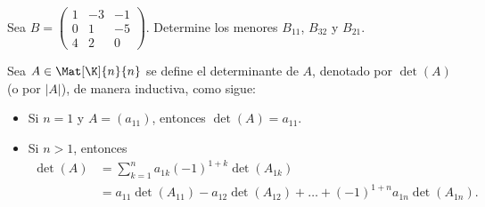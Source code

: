 \documentclass[compacto,10pt]{pubciencias-notas}
\begin{document}
\begin{ejer}
\item Sea
$B = \begin{pmatrix}
    1 & -3 & -1 \\
    0 & 1 & -5 \\
    4 & 2 & 0
\end{pmatrix}$. Determine los menores $B_{11}$, $B_{32}$ y $B_{21}$.
\end{ejer}


\begin{defi}[Determinante] 
    Sea $A\in \Mat[\K]{n}{n}$ se define el determinante de $A$, denotado por $\det(A)$ (o por $|A|$), de manera inductiva, como sigue:
    \begin{itemize}
    \item 
        Si $n=1$ y $A=(a_{11})$, entonces $\det(A) = a_{11}$.
    \item
        Si $n>1$, entonces
        \begin{align*}
            \det(A) 
            & = \sum_{k=1}^n a_{1k}(-1)^{1+k}\det(A_{1k})\\
            & = a_{11}\det(A_{11}) - a_{12}\det(A_{12}) 
            + \ldots +  (-1)^{1+n} a_{1n}\det(A_{1n}).
        \end{align*}
    \end{itemize}
\end{defi}
\end{document}
